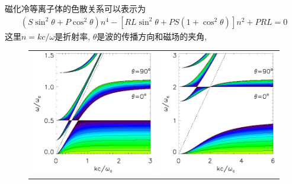 \documentclass{article}
\begin{document}
	磁化冷等离子体的色散关系可以表示为\citep{Diver2001}
	\begin{align}
		\left(S \sin^2 \theta + P \cos^2 \theta\right) n^4 - \left[R L \sin^2 \theta
		+ P S \left(1 + \cos^2 \theta\right) \right] n^2 + P R L= 0 \label{Eqn:Colp}
	\end{align}
	这里$n = k c / \omega$是折射率, $\theta$是波的传播方向和磁场的夹角,
	\begin{figure}[htb]
		\begin{tabular}{cc}
			\includegraphics[scale=0.45]{figure2_2.eps} &
			\includegraphics[scale=0.45]{figure2_1.eps}

\end{tabular}
\end{figure}
\end{document}
